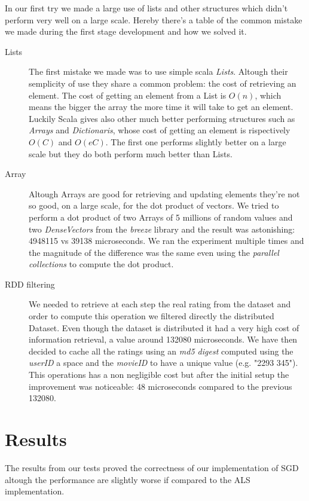 \documentclass{sig-alternate-05-2015}
\begin{document}
In our first try we made a large use of lists and other structures which didn't
perform very well on a large scale. Hereby there's a table of the common mistake
we made during the first stage development and how we solved it.\\
\begin{description}
  \item[Lists] The first mistake we made was to use simple scala \textit{Lists}. Altough their semplicity of use
  they share a common problem: the cost of retrieving an element. The cost of getting an element from a List is $O(n)$,
  which means the bigger the array the more time it will take to get an element. Luckily Scala gives also other much
  better performing structures such as \textit{Arrays} and \textit{Dictionaris}, whose cost of getting an element is rispectively
  $O(C)$ and $O(eC)$. The first one performs slightly better on a large scale but they do both perform much better than Lists.
  \item[Array] Altough Arrays are good for retrieving and updating elements they're not so good, on a large scale, for the dot product of vectors.
  We tried to perform a dot product of two Arrays of 5 millions of random values and two \textit{DenseVectors} from the \textit{breeze} library
  and the result was astonishing: 4948115 vs 39138 microseconds. We ran the experiment multiple times and the magnitude of the difference was the same
  even using the \textit{parallel collections} to compute the dot product.
  \item[RDD filtering] We needed to retrieve at each step the real rating from the dataset and order to compute this operation we filtered
  directly the distributed Dataset. Even though the dataset is distributed it had a very high cost of information retrieval, a value around 132080 microseconds.
  We have then decided to cache all the ratings using an \textit{md5 digest} computed using the \textit{userID} a space and the \textit{movieID} to have
  a unique value (e.g. "2293 345"). This operations has a non negligible cost but after the initial setup the improvement was noticeable: 48 microseconds compared
  to the previous 132080.
\end{description}




\section{Results}
The results from our tests proved the correctness of our implementation of SGD altough the performance are slightly worse if compared to
the ALS implementation.
\end{document}
